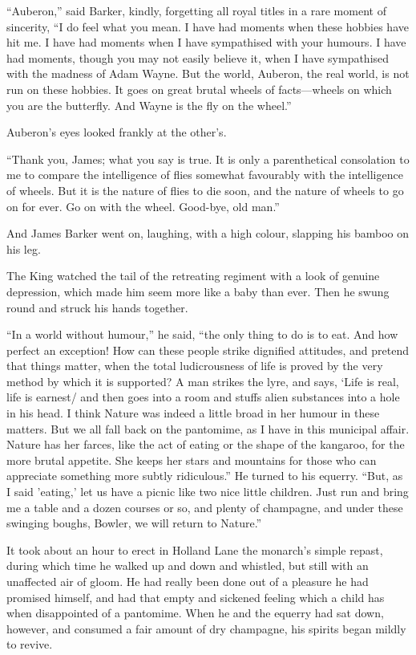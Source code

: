 \documentclass{book}
\begin{document}
“Auberon,” said Barker, kindly, forgetting all royal titles in a rare moment of sincerity, “I do feel what you mean. I have had moments when these hobbies have hit me. I have had moments when I have sympathised with your humours. I have had moments, though you may not easily believe it, when I have sympathised with the madness of Adam Wayne. But the world, Auberon, the real world, is not run on these hobbies. It goes on great brutal wheels of facts—wheels on which you are the butterfly. And Wayne is the fly on the wheel.”

Auberon’s eyes looked frankly at the other’s.

“Thank you, James; what you say is true. It is only a parenthetical consolation to me to compare the intelligence of flies somewhat favourably with the intelligence of wheels. But it is the nature of flies to die soon, and the nature of wheels to go on for ever. Go on with the wheel. Good-bye, old man.”

And James Barker went on, laughing, with a high colour, slapping his bamboo on his leg.

The King watched the tail of the retreating regiment with a look of genuine depression, which made him seem more like a baby than ever. Then he swung round and struck his hands together.

“In a world without humour,” he said, “the only thing to do is to eat. And how perfect an exception! How can these people strike dignified attitudes, and pretend that things matter, when the total ludicrousness of life is proved by the very method by which it is supported? A man strikes the lyre, and says, ‘Life is real, life is earnest/ and then goes into a room and stuffs alien substances into a hole in his head. I think Nature was indeed a little broad in her humour in these matters. But we all fall back on the pantomime, as I have in this municipal affair. Nature has her farces, like the act of eating or the shape of the kangaroo, for the more brutal appetite. She keeps her stars and mountains for those who can appreciate something more subtly ridiculous.” He turned to his equerry. “But, as I said ’eating,’ let us have a picnic like two nice little children. Just run and bring me a table and a dozen courses or so, and plenty of champagne, and under these swinging boughs, Bowler, we will return to Nature.”

It took about an hour to erect in Holland Lane the monarch’s simple repast, during which time he walked up and down and whistled, but still with an unaffected air of gloom. He had really been done out of a pleasure he had promised himself, and had that empty and sickened feeling which a child has when disappointed of a pantomime. When he and the equerry had sat down, however, and consumed a fair amount of dry champagne, his spirits began mildly to revive.
\end{document}

